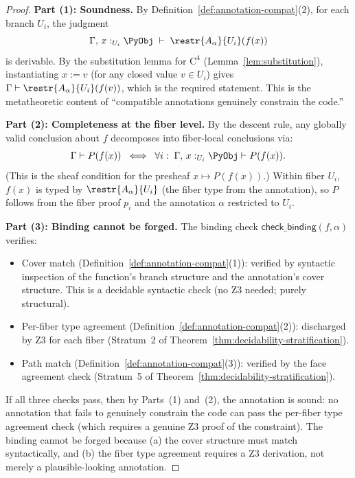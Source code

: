 \begin{proof}
\textbf{Part (1): Soundness.}
By Definition~\ref{def:annotation-compat}(2), for each branch $U_i$,
the judgment
\[
  \Gamma,\, x :_{{U_i}} \PyObj \;\vdash\; \restr{A_\alpha}{U_i}(f(x))
\]
is derivable.  By the substitution lemma for $\mathrm{C}^4$
(Lemma~\ref{lem:substitution}), instantiating $x := v$ (for any closed
value $v \in U_i$) gives
$\Gamma \vdash \restr{A_\alpha}{U_i}(f(v))$,
which is the required statement.  This is the metatheoretic content of
``compatible annotations genuinely constrain the code.''

\textbf{Part (2): Completeness at the fiber level.}
By the descent rule, any globally valid conclusion about $f$
decomposes into fiber-local conclusions via:
\[
  \Gamma \vdash P(f(x))
  \;\iff\;
  \forall i:\; \Gamma,\,x:_{{U_i}} \PyObj \vdash P(f(x)).
\]
(This is the sheaf condition for the presheaf $x \mapsto P(f(x))$.)
Within fiber $U_i$, $f(x)$ is typed by $\restr{A_\alpha}{U_i}$
(the fiber type from the annotation), so $P$ follows from the
fiber proof $p_i$ and the annotation $\alpha$ restricted to $U_i$.

\textbf{Part (3): Binding cannot be forged.}
The binding check $\mathsf{check\_binding}(f, \alpha)$ verifies:
\begin{itemize}
\item Cover match (Definition~\ref{def:annotation-compat}(1)):
  verified by syntactic inspection of the function's branch structure
  and the annotation's cover structure.  This is a decidable syntactic
  check (no Z3 needed; purely structural).
\item Per-fiber type agreement (Definition~\ref{def:annotation-compat}(2)):
  discharged by Z3 for each fiber (Stratum~2 of
  Theorem~\ref{thm:decidability-stratification}).
\item Path match (Definition~\ref{def:annotation-compat}(3)):
  verified by the face agreement check (Stratum~5 of
  Theorem~\ref{thm:decidability-stratification}).
\end{itemize}
If all three checks pass, then by Parts~(1) and~(2), the annotation
is sound: no annotation that fails to genuinely constrain the code
can pass the per-fiber type agreement check (which requires a genuine Z3
proof of the constraint).  The binding cannot be forged because
(a) the cover structure must match syntactically, and
(b) the fiber type agreement requires a Z3 derivation, not merely a
plausible-looking annotation.
\end{proof}

